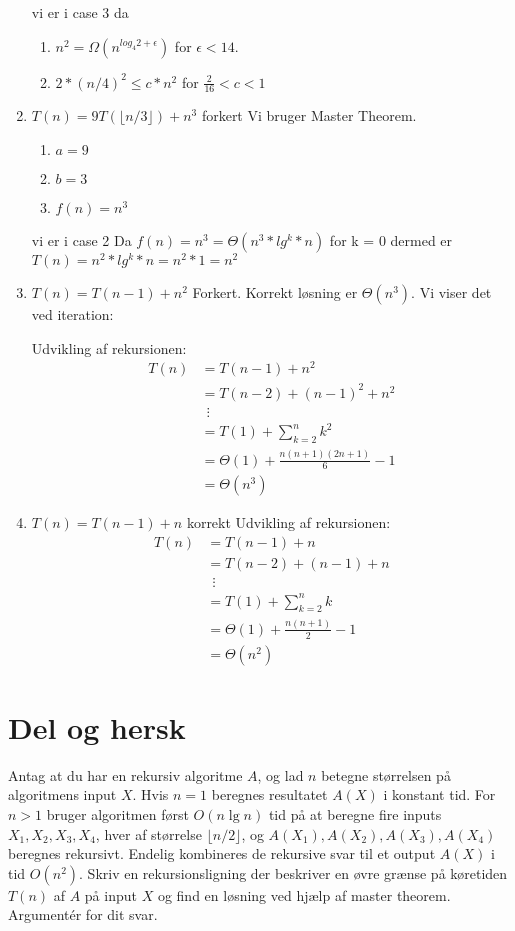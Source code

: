 \documentclass{article}
\theoremstyle{definition}
\begin{document}
\begin{enumerate}
    vi er i case 3 da
    \begin{enumerate}
        \item $n^2 = \Omega(n^{log_4 2+\epsilon})$ for $\epsilon < 14$.
        \item $2*(n/4)^2 \leq c*n^2$ for $\frac{2}{16} < c < 1$
    \end{enumerate}


    \item $T(n) = 9T(\lfloor n/3 \rfloor) + n^3$
    forkert
    Vi bruger Master Theorem.
    \begin{enumerate}
        \item $a=9$
        \item $b=3$
        \item $f(n) = n^3$
    \end{enumerate}
    vi er i case 2 Da
    $f(n)=n^3=\Theta(n^3 * lg^{k}*n)$ for k = 0
    dermed er $T(n)=n^2*lg^{k}*n=n^2*1=n^2$

    \item $T(n) = T(n-1) + n^2$
    Forkert. Korrekt løsning er $\Theta(n^3)$. 
    Vi viser det ved iteration:
    
    Udvikling af rekursionen:
    \begin{align*}
    T(n) &= T(n-1) + n^2 \\
         &= T(n-2) + (n-1)^2 + n^2 \\
         &\ \ \vdots \\
         &= T(1) + \sum_{k=2}^n k^2 \\
         &= \Theta(1) + \frac{n(n+1)(2n+1)}{6} - 1 \\
         &= \Theta(n^3)
    \end{align*}

    \item $T(n) = T(n-1) + n$
    korrekt
    Udvikling af rekursionen:
    \begin{align*}
    T(n) &= T(n-1) + n \\
         &= T(n-2) + (n-1) + n \\
         &\ \ \vdots \\
         &= T(1) + \sum_{k=2}^n k \\
         &= \Theta(1) + \frac{n(n+1)}{2} - 1 \\
         &= \Theta(n^2)
    \end{align*}
\end{enumerate}

\section{Del og hersk}
Antag at du har en rekursiv algoritme $A$, og lad $n$ betegne størrelsen på algoritmens 
input $X$. Hvis $n=1$ beregnes resultatet $A(X)$ i konstant tid. For $n > 1$ bruger algoritmen 
først $O(n\lg n)$ tid på at beregne fire inputs $X_1, X_2, X_3, X_4$, hver af størrelse $\lfloor n/2 \rfloor$, og 
$A(X_1), A(X_2), A(X_3), A(X_4)$ beregnes rekursivt. Endelig kombineres de rekursive svar til 
et output $A(X)$ i tid $O(n^2)$. Skriv en rekursionsligning der beskriver en øvre grænse 
på køretiden $T(n)$ af $A$ på input $X$ og find en løsning ved hjælp af master theorem. 
Argumentér for dit svar.
\end{document}
